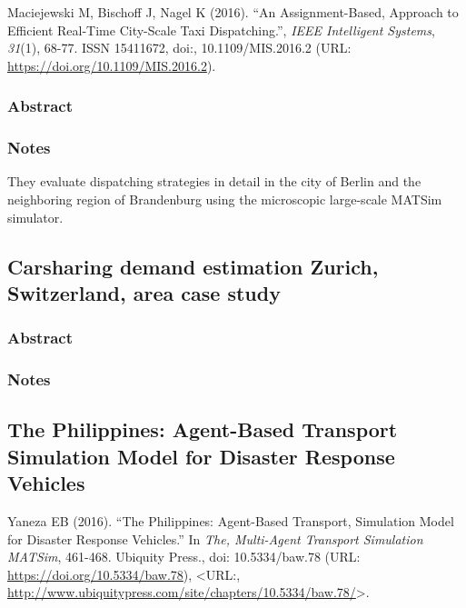 \documentclass[]{article}
\begin{document}
Maciejewski M, Bischoff J, Nagel K (2016). ``An Assignment-Based,
Approach to Efficient Real-Time City-Scale Taxi Dispatching.'',
\emph{IEEE Intelligent Systems}, \emph{31}(1), 68-77. ISSN 15411672,
doi:, 10.1109/MIS.2016.2 (URL:
\url{https://doi.org/10.1109/MIS.2016.2}).

\hypertarget{abstract-7}{%
\subsubsection{Abstract}\label{abstract-7}}

\hypertarget{notes-7}{%
\subsubsection{Notes}\label{notes-7}}

They evaluate dispatching strategies in detail in the city of Berlin and
the neighboring region of Brandenburg using the microscopic large-scale
MATSim simulator.

\hypertarget{carsharing-demand-estimation-zurich-switzerland-area-case-study}{%
\subsection{Carsharing demand estimation Zurich, Switzerland, area case
study}\label{carsharing-demand-estimation-zurich-switzerland-area-case-study}}

\hypertarget{abstract-8}{%
\subsubsection{Abstract}\label{abstract-8}}

\hypertarget{notes-8}{%
\subsubsection{Notes}\label{notes-8}}

\hypertarget{the-philippines-agent-based-transport-simulation-model-for-disaster-response-vehicles}{%
\subsection{The Philippines: Agent-Based Transport Simulation Model for
Disaster Response
Vehicles}\label{the-philippines-agent-based-transport-simulation-model-for-disaster-response-vehicles}}

Yaneza EB (2016). ``The Philippines: Agent-Based Transport, Simulation
Model for Disaster Response Vehicles.'' In \emph{The, Multi-Agent
Transport Simulation MATSim}, 461-468. Ubiquity Press., doi:
10.5334/baw.78 (URL: \url{https://doi.org/10.5334/baw.78}),
\textless URL:,
\url{http://www.ubiquitypress.com/site/chapters/10.5334/baw.78/}\textgreater.
\end{document}
